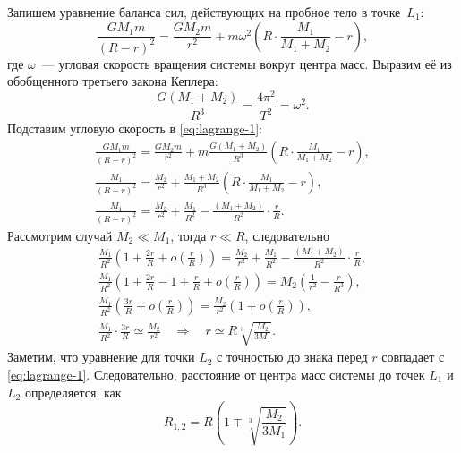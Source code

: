 Запишем уравнение баланса сил, действующих на пробное тело в точке~$L_1$:
\begin{equation}
	\frac{GM_1 m}{(R - r)^2} = \frac{G M_2 m}{r^2} + m \omega^2 \left(R \cdot \frac{M_1}{M_1 + M_2} - r \right),
	\label{eq:lagrange-1}
\end{equation}
где $\omega$~--- угловая скорость вращения системы вокруг центра масс. Выразим её из обобщенного третьего закона Кеплера:
\begin{equation*}
	\frac{G \left(M_1 + M_2 \right)}{R^3} = \frac{4 \pi^2}{T^2} = \omega^2.
\end{equation*}
Подставим угловую скорость в \eqref{eq:lagrange-1}:
\begin{gather*}
	\frac{GM_1 m}{(R - r)^2} = \frac{G M_2 m}{r^2} + m \frac{G \left(M_1 + M_2 \right)}{R^3} \left(R \cdot \frac{M_1}{M_1 + M_2} - r \right),\\
	\frac{M_1}{(R - r)^2} = \frac{M_2}{r^2} + \frac{M_1 + M_2}{R^3} \left(R \cdot\frac{M_1}{M_1 + M_2} - r \right),\\
	\frac{M_1}{(R - r)^2} = \frac{M_2}{r^2} + \frac{M_1}{R^2} - \frac{\left(M_1 + M_2 \right)}{R^2} \cdot \frac{r}{R}.
\end{gather*}
Рассмотрим случай $M_2 \ll M_1$, тогда $r \ll R$, следовательно
\begin{gather*}
	\frac{M_1}{R^2} \left(1 + \frac{2r}{R} + o\left(\frac{r}{R}\right) \right) = \frac{M_2}{r^2} + \frac{M_1}{R^2} - \frac{\left(M_1 + M_2 \right)}{R^2} \cdot \frac{r}{R},\\
	\frac{M_1}{R^2} \left( 1 + \frac{2r}{R} - 1 + \frac{r}{R}  + o\left(\frac{r}{R}\right) \right) = M_2 \left( \frac{1}{r^2} - \frac{r}{R^3} \right), \\
	\frac{M_1}{R^2} \left( \frac{3r}{R} + o\left(\frac{r}{R}\right) \right) =
	\frac{M_2}{r^2} \left( 1 +  o\left(\frac{r}{R}\right)  \right),\\
	\frac{M_1}{R^2} \cdot \frac{3r}{R} \simeq \frac{M_2}{r^2} \quad \Rightarrow \quad r \simeq R \sqrt[3]{\frac{M_2}{3M_1}}.
\end{gather*}
Заметим, что уравнение для точки $L_2$ с точностью до знака перед $r$ совпадает с \eqref{eq:lagrange-1}. Следовательно, расстояние от центра масс системы до точек $L_1$ и $L_2$ определяется, как
\begin{equation}
	R_{1,2} = R \left( 1 \mp \sqrt[3]{\frac{M_2}{3M_1}} \right).
\end{equation}


